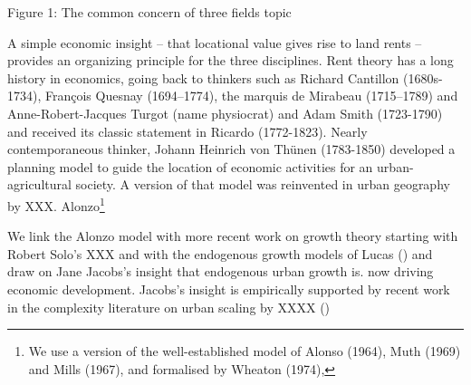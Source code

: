 Figure 1: The common concern of three fields
topic 

A simple economic insight -- that locational value gives rise to land rents -- provides an organizing principle for the three disciplines. Rent theory has a long history in economics, going back to thinkers such as Richard Cantillon (1680s-1734), François Quesnay (1694–1774), the marquis de Mirabeau (1715–1789) and Anne-Robert-Jacques Turgot (name physiocrat) and Adam Smith (1723-1790) and received its classic statement in Ricardo (1772-1823). Nearly contemporaneous thinker, Johann Heinrich  von Th\"unen (1783-1850) developed a planning model to guide the location of economic activities for an urban-agricultural society.  A version of that model  was reinvented in urban geography by XXX. Alonzo\footnote{We use a version of the well-established model of Alonso (1964), Muth (1969) and Mills (1967), and formalised by Wheaton (1974),}

We link the Alonzo model with more recent work on growth theory starting with Robert Solo's XXX and with the endogenous growth models of Lucas () and draw on Jane Jacobs's insight that endogenous urban growth  is. now driving economic development. Jacobs's insight is empirically supported by recent work in the complexity literature on urban scaling by XXXX ()




